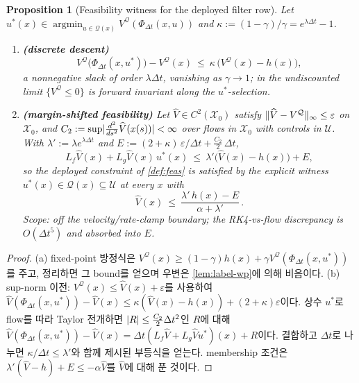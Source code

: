 \documentclass[11pt]{article}
\theoremstyle{plain}
\newtheorem{proposition}[theorem]{Proposition}
\theoremstyle{definition}
\theoremstyle{remark}
\DeclarePairedDelimiter{\norm}{\lVert}{\rVert}
\DeclarePairedDelimiter{\abs}{\lvert}{\rvert}
\newcommand{\calX}{\mathcal{X}}
\newcommand{\calU}{\mathcal{U}}
\newcommand{\calQ}{\mathcal{Q}}
\newcommand{\Vhat}{\widehat V}
\newcommand{\Lg}{L_g}
\newcommand{\Lf}{L_f}
\newcommand{\eqdef}{:=}
\begin{document}
\begin{proposition}[Feasibility witness for the deployed filter row]\label{prop:label-feas}
Let $u^*(x)\in\operatorname*{argmin}_{u\in\calQ(x)}V^{\calQ}(\Phi_{\Delta t}(x,u))$ and
$\kappa\eqdef(1-\gamma)/\gamma=e^{\lambda\Delta t}-1$.
\begin{enumerate}[label=(\alph*)]
  \item \textbf{(discrete descent)}
  \begin{equation}
  V^{\calQ}\big(\Phi_{\Delta t}(x,u^*)\big)-V^{\calQ}(x)\ \le\
  \kappa\,\big(V^{\calQ}(x)-h(x)\big),
  \end{equation}
  a nonnegative slack of order $\lambda\Delta t$, vanishing as $\gamma\to1$; in the undiscounted
  limit $\{V^{\calQ}\le0\}$ is forward invariant along the $u^*$-selection.
  \item \textbf{(margin-shifted feasibility)} Let $\Vhat\in C^2(\calX_0)$ satisfy
  $\norm{\Vhat-V^{\calQ}}_\infty\le\varepsilon$ on $\calX_0$, and
  $C_2\eqdef\sup\abs{\tfrac{d^2}{ds^2}\Vhat(x(s))}<\infty$ over flows in $\calX_0$ with controls
  in $\calU$. With $\lambda'\eqdef\lambda e^{\lambda\Delta t}$ and
  $E\eqdef(2+\kappa)\,\varepsilon/\Delta t+\tfrac{C_2}{2}\,\Delta t$,
  \begin{equation}
  \Lf\Vhat(x)+\Lg\Vhat(x)\,u^*(x)\ \le\ \lambda'\big(\Vhat(x)-h(x)\big)+E,
  \end{equation}
  so the deployed constraint of \cref{def:feas} is satisfied by the explicit witness
  $u^*(x)\in\calQ(x)\subseteq\calU$ at every $x$ with
  \begin{equation}
  \Vhat(x)\ \le\ \frac{\lambda'\,h(x)-E}{\alpha+\lambda'}\,.
  \end{equation}
  Scope: off the velocity/rate-clamp boundary; the RK4-vs-flow discrepancy is $O(\Delta t^5)$
  and absorbed into $E$.
\end{enumerate}
\end{proposition}
\begin{proof}
(a) fixed-point 방정식은
$V^{\calQ}(x)\ge(1-\gamma)h(x)+\gamma V^{\calQ}(\Phi_{\Delta t}(x,u^*))$를 주고, 정리하면 그
bound를 얻으며 우변은 \cref{lem:label-wp}에 의해 비음이다. (b) sup-norm 이전:
$V^{\calQ}(x)\le\Vhat(x)+\varepsilon$를 사용하여
$\Vhat(\Phi_{\Delta t}(x,u^*))-\Vhat(x)\le\kappa(\Vhat(x)-h(x))+(2+\kappa)\varepsilon$이다.
상수 $u^*$로 flow를 따라 Taylor 전개하면 $\abs R\le\tfrac{C_2}{2}\Delta t^2$인 $R$에 대해
$\Vhat(\Phi_{\Delta t}(x,u^*))-\Vhat(x)=\Delta t(\Lf\Vhat+\Lg\Vhat u^*)(x)+R$이다. 결합하고
$\Delta t$로 나누면 $\kappa/\Delta t\le\lambda'$와 함께 제시된 부등식을 얻는다. membership 조건은
$\lambda'(\Vhat-h)+E\le-\alpha\Vhat$를 $\Vhat$에 대해 푼 것이다.
\end{proof}
\end{document}
